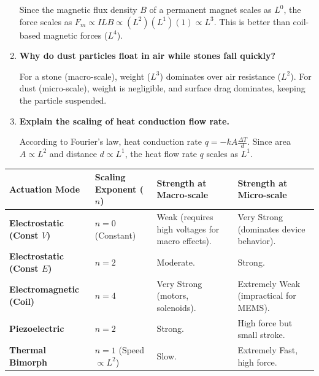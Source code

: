\documentclass[12pt,a4paper]{article}
\newcommand{\Q}[1]{\textbf{#1}\par\noindent\ignorespaces}
\renewcommand{\arraystretch}{1.45}
\begin{document}
\begin{tcolorbox}[exambox, title={\textbf{Frequently Asked / Viva Questions}}]
\begin{enumerate}[topsep=0pt, label=\textbf{Q\arabic*.}, itemsep=5pt]
    Since the magnetic flux density $B$ of a permanent magnet scales as $L^0$, the force scales as $F_m \propto I L B \propto (L^2)(L^1)(1) \propto L^3$. This is better than coil-based magnetic forces ($L^4$).
  \item \Q{Why do dust particles float in air while stones fall quickly?}
    For a stone (macro-scale), weight ($L^3$) dominates over air resistance ($L^2$). For dust (micro-scale), weight is negligible, and surface drag dominates, keeping the particle suspended.
  \item \Q{Explain the scaling of heat conduction flow rate.}
    According to Fourier's law, heat conduction rate $q = -k A \frac{\Delta T}{d}$. Since area $A \propto L^2$ and distance $d \propto L^1$, the heat flow rate $q$ scales as $L^1$.
  \end{enumerate}
\end{tcolorbox}

\begin{tcolorbox}[tikzbox, title={Actuator Scaling Law Comparison Summary}]
\renewcommand{\arraystretch}{1.45}
\par\noindent
\begin{tabularx}{\linewidth}{|B{3.2cm}|Y|Y|Y|}
\hline
\textbf{Actuation Mode} & \textbf{Scaling Exponent ($n$)} & \textbf{Strength at Macro-scale} & \textbf{Strength at Micro-scale} \\
\hline
\textbf{Electrostatic (Const $V$)} & $n = 0$ (Constant) & Weak (requires high voltages for macro effects). & Very Strong (dominates device behavior). \\
\hline
\textbf{Electrostatic (Const $E$)} & $n = 2$ & Moderate. & Strong. \\
\hline
\textbf{Electromagnetic (Coil)} & $n = 4$ & Very Strong (motors, solenoids). & Extremely Weak (impractical for MEMS). \\
\hline
\textbf{Piezoelectric} & $n = 2$ & Strong. & High force but small stroke. \\
\hline
\textbf{Thermal Bimorph} & $n = 1$ (Speed $\propto L^2$) & Slow. & Extremely Fast, high force. \\
\hline
\end{tabularx}
\end{tcolorbox}
\end{document}
